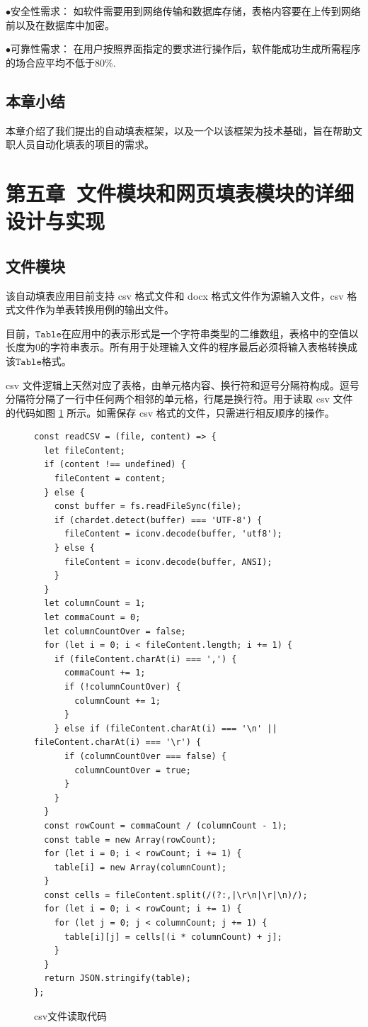 \documentclass[design, pageheader]{njubachelor}
\begin{document}
$\bullet$安全性需求：
如软件需要用到网络传输和数据库存储，表格内容要在上传到网络前以及在数据库中加密。

$\bullet$可靠性需求：
在用户按照界面指定的要求进行操作后，软件能成功生成所需程序的场合应平均不低于80\%.

\subsection{本章小结}
本章介绍了我们提出的自动填表框架，以及一个以该框架为技术基础，旨在帮助文职人员自动化填表的项目的需求。

\section{第五章~文件模块和网页填表模块的详细设计与实现}
\subsection{文件模块}
该自动填表应用目前支持 csv 格式文件和 docx 格式文件作为源输入文件，csv 格式文件作为单表转换用例的输出文件。

目前，$\mathtt{Table}$在应用中的表示形式是一个字符串类型的二维数组，表格中的空值以长度为0的字符串表示。所有用于处理输入文件的程序最后必须将输入表格转换成该$\mathtt{Table}$格式。

csv 文件逻辑上天然对应了表格，由单元格内容、换行符和逗号分隔符构成。逗号分隔符分隔了一行中任何两个相邻的单元格，行尾是换行符。用于读取 csv 文件的代码如图 \ref{fig:csv} 所示。如需保存 csv 格式的文件，只需进行相反顺序的操作。
\begin{figure}
  \begin{lstlisting}[style=htmlcssjs]
const readCSV = (file, content) => {
  let fileContent;
  if (content !== undefined) {
    fileContent = content;
  } else {
    const buffer = fs.readFileSync(file);
    if (chardet.detect(buffer) === 'UTF-8') {
      fileContent = iconv.decode(buffer, 'utf8');
    } else {
      fileContent = iconv.decode(buffer, ANSI);
    }
  }
  let columnCount = 1;
  let commaCount = 0;
  let columnCountOver = false;
  for (let i = 0; i < fileContent.length; i += 1) {
    if (fileContent.charAt(i) === ',') {
      commaCount += 1;
      if (!columnCountOver) {
        columnCount += 1;
      }
    } else if (fileContent.charAt(i) === '\n' || fileContent.charAt(i) === '\r') {
      if (columnCountOver === false) {
        columnCountOver = true;
      }
    }
  }
  const rowCount = commaCount / (columnCount - 1);
  const table = new Array(rowCount);
  for (let i = 0; i < rowCount; i += 1) {
    table[i] = new Array(columnCount);
  }
  const cells = fileContent.split(/(?:,|\r\n|\r|\n)/);
  for (let i = 0; i < rowCount; i += 1) {
    for (let j = 0; j < columnCount; j += 1) {
      table[i][j] = cells[(i * columnCount) + j];
    }
  }
  return JSON.stringify(table);
};
\end{lstlisting}
    \caption{csv文件读取代码}
    \label{fig:csv}
\end{figure}
\end{document}
